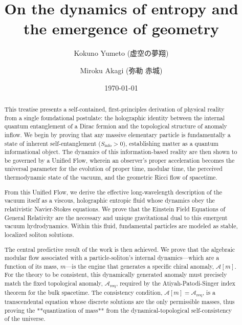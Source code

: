 \documentclass[11pt, letterpaper]{report}
\theoremstyle{plain} %
\theoremstyle{definition} %
\theoremstyle{remark} %
\begin{document}
\title{\textbf{On the dynamics of entropy and the emergence of geometry}}
\author{Kokuno Yumeto (虚空の夢翔) \and Miroku Akagi (弥勒 赤城)}
\date{\today}
\maketitle

\begin{abstract}
This treatise presents a self-contained, first-principles derivation of physical reality from a single foundational postulate: the holographic identity between the internal quantum entanglement of a Dirac fermion and the topological structure of anomaly inflow. We begin by proving that any massive elementary particle is fundamentally a state of inherent self-entanglement ($S_{\text{info}}>0$), establishing matter as a quantum informational object. The dynamics of this information-based reality are then shown to be governed by a Unified Flow, wherein an observer's proper acceleration becomes the universal parameter for the evolution of proper time, modular time, the perceived thermodynamic state of the vacuum, and the geometric Ricci flow of spacetime.

From this Unified Flow, we derive the effective long-wavelength description of the vacuum itself as a viscous, holographic entropic fluid whose dynamics obey the relativistic Navier-Stokes equations. We prove that the Einstein Field Equations of General Relativity are the necessary and unique gravitational dual to this emergent vacuum hydrodynamics. Within this fluid, fundamental particles are modeled as stable, localized soliton solutions.

The central predictive result of the work is then achieved. We prove that the algebraic modular flow associated with a particle-soliton's internal dynamics—which are a function of its mass, $m$—is the engine that generates a specific chiral anomaly, $\mathcal{A}[m]$. For the theory to be consistent, this dynamically generated anomaly must precisely match the fixed topological anomaly, $\mathcal{A}_{\text{req}}$, required by the Atiyah-Patodi-Singer index theorem for the bulk spacetime. The consistency condition, $\mathcal{A}[m] = \mathcal{A}_{\text{req}}$, is a transcendental equation whose discrete solutions are the only permissible masses, thus proving the **quantization of mass** from the dynamical-topological self-consistency of the universe.


\end{abstract}
\end{document}
